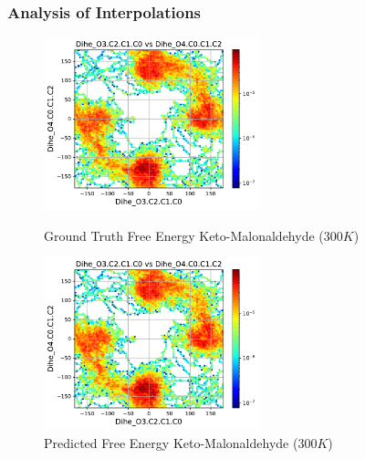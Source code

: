 \documentclass[usenames, dvipsnames, t]{beamer}
\begin{document}
\begin{frame}
	\frametitle{Analysis of Interpolations}
	\begin{figure}[htb]
		\begin{minipage}{0.49\textwidth}
			\includegraphics[width=0.9\linewidth, height=5cm]{KETO-MDA_300K_GroundTruth.pdf} 
			\caption{Ground Truth Free Energy Keto-Malonaldehyde ($300K$)}
		\end{minipage}
		\begin{minipage}{0.49\textwidth}
			\includegraphics[width=0.9\linewidth, height=5cm]{KETO-MDA_300K_ML.pdf}
			\caption{Predicted Free Energy Keto-Malonaldehyde ($300K$)}
		\end{minipage}
	\end{figure}
\end{frame}
\end{document}
